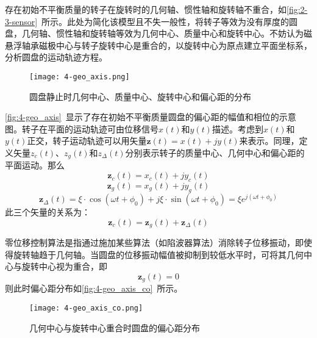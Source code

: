 \documentclass[
  lang=cn,
  degree=master,
  openany,oneside
]{nuaathesis}
\begin{document}
存在初始不平衡质量的转子在旋转时的几何轴、惯性轴和旋转轴不重合，如\autoref{fig:2-3-sensor}~所示。此处为简化该模型且不失一般性，将转子等效为没有厚度的圆盘，几何轴、惯性轴和旋转轴等效为几何中心、质量中心和旋转中心。不妨认为磁悬浮轴承磁极中心与转子旋转中心是重合的，以旋转中心为原点建立平面坐标系，分析圆盘的运动轨迹方程。
\begin{figure}
	\texttt{[image: 4-geo\_axis.png]}
	\caption{圆盘静止时几何中心、质量中心、旋转中心和偏心距的分布}
	\label{fig:4-geo_axis}
\end{figure}
\autoref{fig:4-geo_axis}~显示了存在初始不平衡质量圆盘的偏心距的幅值和相位的示意图。转子在平面的运动轨迹可由位移信号$x(t)$和$y(t)$描述。考虑到$x(t)$和$y(t)$正交，转子运动轨迹可以用矢量$\boldsymbol{z}(t) = x(t) + jy(t)$来表示。同理，定义矢量$z_c(t)$、$z_g(t)$和$z_{\Delta}(t)$分别表示转子的质量中心、几何中心和偏心距的平面运动。那么
\begin{equation}
\boldsymbol{z}_c(t) = x_c(t) + jy_c(t)
\end{equation}
\begin{equation}
\boldsymbol{z}_g(t) = x_g(t) + jy_g(t)
\end{equation}
\begin{equation}
\label{eq:z_delta}
\boldsymbol{z}_{\Delta}(t) = \xi \cdot \cos(\omega t+\phi _0) + j\xi \cdot \sin(\omega t + \phi _0) = \xi e^{j(\omega t + \phi _0)}
\end{equation}
此三个矢量的关系为：
\begin{equation}
	\label{eq:z_c}
	\boldsymbol{z}_c(t) = \boldsymbol{z}_g(t) + \boldsymbol{z}_{\Delta}(t)
\end{equation}

零位移控制算法是指通过施加某些算法（如陷波器算法）消除转子位移振动，即使得旋转轴趋于几何轴。当圆盘的位移振动幅值被抑制到较低水平时，可将其几何中心与旋转中心视为重合，即
\begin{equation}
	\label{eq:z_g_0x}
	\boldsymbol{z}_g(t) = 0
\end{equation}
则此时偏心距分布如\autoref{fig:4-geo_axis_co}~所示。
\begin{figure}
	\texttt{[image: 4-geo\_axis\_co.png]}
	\caption{几何中心与旋转中心重合时圆盘的偏心距分布}
	\label{fig:4-geo_axis_co}
\end{figure}
\end{document}
